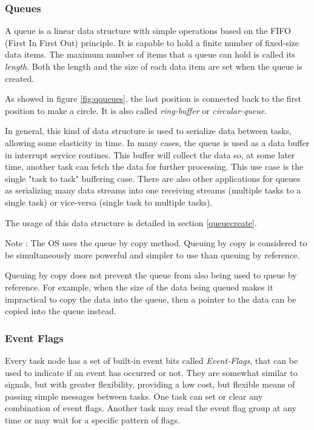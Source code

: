 \subsubsection{Queues}
A queue is a linear data structure with simple operations based on the FIFO (First In First Out) principle. It is capable to hold a finite number of fixed-size data items. The maximum number of items that a queue can hold is called its \textit{length}. Both the length and the size of each data item are set when the queue is created.

As showed in figure \ref{fig:qqueues}, the last position is connected back to the first position to make a circle. It is also called \textit{ring-buffer} or \textit{circular-queue}. 

In general, this kind of data structure is used to serialize data between tasks, allowing some elasticity in time. In many cases, the queue is used as a data buffer in interrupt service routines. This buffer will collect the data so, at some later time, another task can fetch the data for further processing. This use case is the single "task to task" buffering case. There are also other applications for queues as serializing  many data streams into one receiving streams (multiple tasks to a single task) or vice-versa (single task to multiple tasks).



The usage of this data structure is detailed in section \ref{queuecreate}.
\medskip
\begin{tcolorbox}
\ArrowBoldDownRight Note : The OS uses the queue by copy method. Queuing by copy is considered to be simultaneously more powerful and simpler to use than queuing by reference.
\end{tcolorbox}

Queuing by copy does not prevent the queue from also being used to queue by reference. For example, when the size of the data being queued makes it impractical to copy the data into the queue, then a pointer to the data can be copied into the queue instead.

\subsubsection{Event Flags}
Every task node has a set of built-in event bits called \textit{Event-Flags}, that can be used to indicate if an event has occurred or not.  
They are somewhat similar to signals, but with greater flexibility, providing a low cost, but flexible means of passing simple messages between tasks. One task can set or clear any combination of event flags. Another task may read the event flag group at any time or may wait for a specific pattern of flags.  


